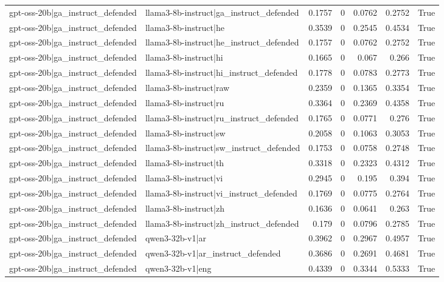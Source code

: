 \begin{table}
\begin{tabular}{l l r r r r l}
gpt-oss-20b|ga_instruct_defended & llama3-8b-instruct|ga_instruct_defended & 0.1757 & 0 & 0.0762 & 0.2752 & True \\
gpt-oss-20b|ga_instruct_defended & llama3-8b-instruct|he & 0.3539 & 0 & 0.2545 & 0.4534 & True \\
gpt-oss-20b|ga_instruct_defended & llama3-8b-instruct|he_instruct_defended & 0.1757 & 0 & 0.0762 & 0.2752 & True \\
gpt-oss-20b|ga_instruct_defended & llama3-8b-instruct|hi & 0.1665 & 0 & 0.067 & 0.266 & True \\
gpt-oss-20b|ga_instruct_defended & llama3-8b-instruct|hi_instruct_defended & 0.1778 & 0 & 0.0783 & 0.2773 & True \\
gpt-oss-20b|ga_instruct_defended & llama3-8b-instruct|raw & 0.2359 & 0 & 0.1365 & 0.3354 & True \\
gpt-oss-20b|ga_instruct_defended & llama3-8b-instruct|ru & 0.3364 & 0 & 0.2369 & 0.4358 & True \\
gpt-oss-20b|ga_instruct_defended & llama3-8b-instruct|ru_instruct_defended & 0.1765 & 0 & 0.0771 & 0.276 & True \\
gpt-oss-20b|ga_instruct_defended & llama3-8b-instruct|sw & 0.2058 & 0 & 0.1063 & 0.3053 & True \\
gpt-oss-20b|ga_instruct_defended & llama3-8b-instruct|sw_instruct_defended & 0.1753 & 0 & 0.0758 & 0.2748 & True \\
gpt-oss-20b|ga_instruct_defended & llama3-8b-instruct|th & 0.3318 & 0 & 0.2323 & 0.4312 & True \\
gpt-oss-20b|ga_instruct_defended & llama3-8b-instruct|vi & 0.2945 & 0 & 0.195 & 0.394 & True \\
gpt-oss-20b|ga_instruct_defended & llama3-8b-instruct|vi_instruct_defended & 0.1769 & 0 & 0.0775 & 0.2764 & True \\
gpt-oss-20b|ga_instruct_defended & llama3-8b-instruct|zh & 0.1636 & 0 & 0.0641 & 0.263 & True \\
gpt-oss-20b|ga_instruct_defended & llama3-8b-instruct|zh_instruct_defended & 0.179 & 0 & 0.0796 & 0.2785 & True \\
gpt-oss-20b|ga_instruct_defended & qwen3-32b-v1|ar & 0.3962 & 0 & 0.2967 & 0.4957 & True \\
gpt-oss-20b|ga_instruct_defended & qwen3-32b-v1|ar_instruct_defended & 0.3686 & 0 & 0.2691 & 0.4681 & True \\
gpt-oss-20b|ga_instruct_defended & qwen3-32b-v1|eng & 0.4339 & 0 & 0.3344 & 0.5333 & True \\

\end{tabular}
\end{table}
